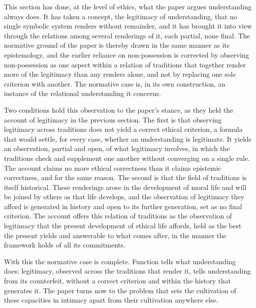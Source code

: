 This section has done, at the level of ethics, what the paper argues understanding always does. It has taken a concept, the legitimacy of understanding, that no single symbolic system renders without remainder, and it has brought it into view through the relations among several renderings of it, each partial, none final. The normative ground of the paper is thereby drawn in the same manner as its epistemology, and the earlier reliance on non-possession is corrected by observing non-possession as one aspect within a relation of traditions that together render more of the legitimacy than any renders alone, and not by replacing one sole criterion with another. The normative case is, in its own construction, an instance of the relational understanding it concerns.

Two conditions hold this observation to the paper's stance, as they held the account of legitimacy in the previous section. The first is that observing legitimacy across traditions does not yield a correct ethical criterion, a formula that would settle, for every case, whether an understanding is legitimate. It yields an observation, partial and open, of what legitimacy involves, in which the traditions check and supplement one another without converging on a single rule. The account claims no more ethical correctness than it claims epistemic correctness, and for the same reason. The second is that the field of traditions is itself historical. These renderings arose in the development of moral life and will be joined by others as that life develops, and the observation of legitimacy they afford is generated in history and open to its further generation, set as no final criterion. The account offers this relation of traditions as the observation of legitimacy that the present development of ethical life affords, held as the best the present yields and answerable to what comes after, in the manner the framework holds of all its commitments.

With this the normative case is complete. Function tells what understanding does; legitimacy, observed across the traditions that render it, tells understanding from its counterfeit, without a correct criterion and within the history that generates it. The paper turns now to the problem that sets the cultivation of these capacities in intimacy apart from their cultivation anywhere else.
